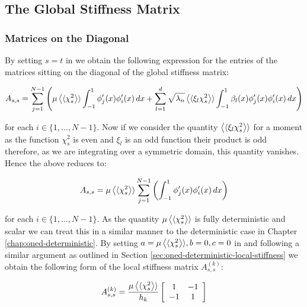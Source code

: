 \subsection{The Global Stiffness Matrix}

\subsubsection{Matrices on the Diagonal}

By setting $s=t$ in  we obtain the following
expression for the entries of the matrices sitting on the diagonal of the
global stiffness matrix:

\begin{equation}
    A_{s,s} = \sum_{j=1}^{N-1}\left(\mu\left\langle\langle\chi_s^2\right\rangle\rangle
        \int_{-1}^1 \phi_j'(x)\phi_i'(x)\, dx
       + \sum_{l=1}^d\sqrt{\lambda_n}\left\langle\langle\xi_l\chi_s^2\right\rangle\rangle
       \int_{-1}^1 \beta_l(x)\phi_j'(x)\phi_i'(x) \, dx\right)
\end{equation}

for each $i \in \{1,\ldots,N-1\}$. Now if we consider the quantity
$\left\langle\langle\xi_l\chi_s^2\right\rangle\rangle$ for a moment as the function $\chi_s^2$ is even and
$\xi_l$ is an odd function their product is odd therefore, as we are integrating
over a symmetric domain, this quantity vanishes. Hence the above reduces to:

\begin{equation}
    A_{s,s} = \mu\left\langle\langle\chi_s^2\right\rangle\rangle\sum_{j=1}^{N - 1}\left(\int_{-1}^1
                \phi_j'(x)\phi_i'(x)\, dx\right)
\end{equation}

for each $i \in \{1,\ldots,N-1\}$. As the quantity $\mu\left\langle\langle\chi_s^2\right\rangle\rangle$ is
fully deterministic and scalar we can treat this in a similar manner to the
deterministic case in  Chapter \ref{chap:oned-deterministic}. By setting $a =
\mu\left\langle\langle\chi_s^2\right\rangle\rangle, b = 0, c = 0$ in 
and following a similar argument as outlined in Section
\ref{sec:oned-deterministic-local-stiffness} we obtain the following form of
the local stiffness matrix $A_{s,s}^{(k)}$:

\begin{equation}\label{eq:oned-stochasic-local-stifness-diag}
    A_{s,s}^{(k)} = \frac{\mu\left\langle\langle\chi_s^2\right\rangle\rangle}{h_k}\left[\begin{array}{c c}
                1 & -1 \\ -1 & 1
              \end{array}\right]
\end{equation}

